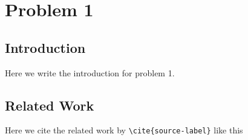\chapter{Problem 1} \label{ch:problem1}


\section{Introduction} \label{sec:problem1-introduction}
Here we write the introduction for problem 1.


\section{Related Work} \label{sec:problem1-related-work}

Here we cite the related work by \texttt{\textbackslash cite\{source-label\}} like this \cite{example-article}